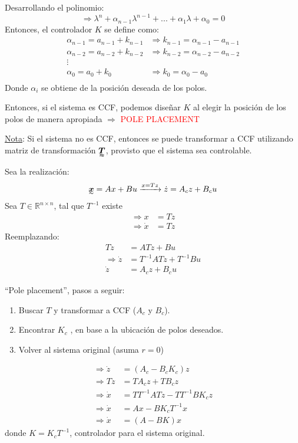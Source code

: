 Desarrollando el polinomio:
$$\Longrightarrow \lambda^n+\alpha_{n-1}\lambda^{n-1}+...+\alpha_1\lambda+\alpha_0=0 $$
Entonces, el controlador $K$ se define como:
\begin{align*}
    \alpha_{n-1} = a_{n-1}+k_{n-1} &\Longrightarrow k_{n-1} = \alpha_{n-1}-a_{n-1}\\
    \alpha_{n-2} = a_{n-2}+k_{n-2} &\Longrightarrow k_{n-2} = \alpha_{n-2}-a_{n-2}\\
    \vdots \\
    \alpha_0 = a_0+k_0 &\Longrightarrow k_0 = \alpha_0-a_0\\
\end{align*}
Donde $\alpha_i$ se obtiene de la posición deseada de los polos. \\
\par Entonces, si el sistema es CCF, podemos diseñar $K$ al elegir la posición de los polos de manera apropiada $\Longrightarrow$ \textcolor{red}{POLE PLACEMENT}\\
\par \underline{Nota}: Si el sistema no es CCF, entonces se puede transformar a CCF utilizando matriz de transformación $\tenq{T}$, provisto que el sistema sea controlable.\\
\par Sea la realización:
\begin{align*}
    \tend{x}=Ax+Bu \xrightarrow[]{x=Tz} \dot{z}=A_cz+B_cu
\end{align*}
Sea $T \in \mathbb{R}^{n\times n}$, tal que $T^{-1}$ existe
\begin{align*}
    \Longrightarrow x&=Tz\\
    \Longrightarrow \dot{x}&=T\dot{z}
\end{align*}
Reemplazando:
\begin{align*}
    T\dot{z} &= ATz+Bu\\
    \Longrightarrow \dot{z}&=T^{-1}ATz+T^{-1}Bu\\
    \dot{z} &= A_cz+B_cu
\end{align*}

``Pole placement'', pasos a seguir:
\begin{enumerate}
    \item Buscar $T$ y transformar a CCF ($A_c$ y $B_c$).
    \item Encontrar $K_c$ , en base a la ubicación de polos deseados.
    \item Volver al sistema original (asuma $r=0$)
\end{enumerate}
\begin{align*}
    \Longrightarrow \dot{z} &= (A_c-B_cK_c)z\\
    \Longrightarrow T\dot{z} &= TA_cz+TB_cz\\
    \Longrightarrow \dot{x} &= TT^{-1}ATz-TT^{-1}BK_cz\\
    \Longrightarrow \dot{x} &= Ax-BK_cT^{-1}x\\
    \Longrightarrow \dot{x} &= (A-BK)x
\end{align*}
donde  $K=K_cT^{-1}$, controlador para el sistema original.

